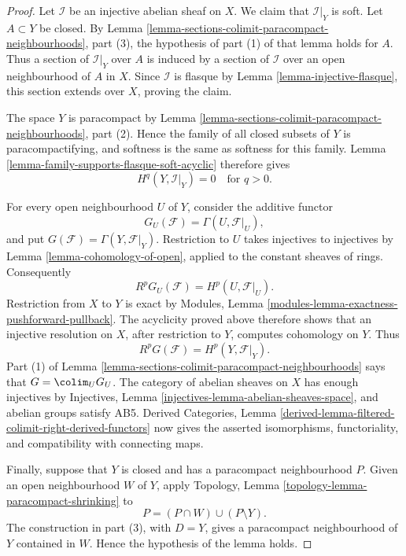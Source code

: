 \begin{proof}
Let $\mathcal{I}$ be an injective abelian sheaf on $X$. We claim that
$\mathcal{I}|_Y$ is soft. Let $A\subset Y$ be closed. By Lemma
\ref{lemma-sections-colimit-paracompact-neighbourhoods}, part (3), the
hypothesis of part (1) of that lemma holds for $A$. Thus a section of
$\mathcal{I}|_Y$ over $A$ is induced by a section of $\mathcal{I}$ over an
open neighbourhood of $A$ in $X$. Since $\mathcal{I}$ is flasque by Lemma
\ref{lemma-injective-flasque}, this section extends over $X$, proving the
claim.

The space $Y$ is paracompact by Lemma
\ref{lemma-sections-colimit-paracompact-neighbourhoods}, part (2). Hence the
family of all closed subsets of $Y$ is paracompactifying, and softness is
the same as softness for this family. Lemma
\ref{lemma-family-supports-flasque-soft-acyclic} therefore gives
$$
H^q(Y,\mathcal{I}|_Y)=0\quad\text{for }q>0.
$$

For every open neighbourhood $U$ of $Y$, consider the additive functor
$$
G_U(\mathcal{F})=\Gamma(U,\mathcal{F}|_U),
$$
and put $G(\mathcal{F})=\Gamma(Y,\mathcal{F}|_Y)$. Restriction to $U$
takes injectives to injectives by Lemma \ref{lemma-cohomology-of-open},
applied to the constant sheaves of rings. Consequently
$$
R^pG_U(\mathcal{F})=H^p(U,\mathcal{F}|_U).
$$
Restriction from $X$ to $Y$ is exact by Modules, Lemma
\ref{modules-lemma-exactness-pushforward-pullback}. The acyclicity proved
above therefore shows that an injective resolution on $X$, after restriction
to $Y$, computes cohomology on $Y$. Thus
$$
R^pG(\mathcal{F})=H^p(Y,\mathcal{F}|_Y).
$$
Part (1) of Lemma
\ref{lemma-sections-colimit-paracompact-neighbourhoods} says that
$G=\colim_U G_U$. The category of abelian sheaves on $X$ has enough
injectives by Injectives, Lemma
\ref{injectives-lemma-abelian-sheaves-space}, and abelian groups satisfy
AB5. Derived Categories, Lemma
\ref{derived-lemma-filtered-colimit-right-derived-functors} now gives the
asserted isomorphisms, functoriality, and compatibility with connecting
maps.

Finally, suppose that $Y$ is closed and has a paracompact neighbourhood
$P$. Given an open neighbourhood $W$ of $Y$, apply
Topology, Lemma \ref{topology-lemma-paracompact-shrinking} to
$$
P=(P\cap W)\cup(P\setminus Y).
$$
The construction in part (3), with $D=Y$, gives a paracompact
neighbourhood of $Y$ contained in $W$. Hence the hypothesis of the lemma
holds.
\end{proof}


